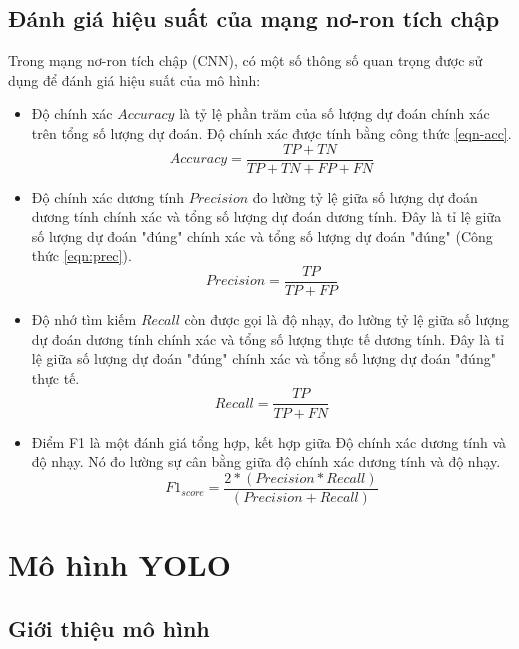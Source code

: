 \subsection{Đánh giá hiệu suất của mạng nơ-ron tích chập}
Trong mạng nơ-ron tích chập (CNN), có một số thông số quan trọng được sử dụng để đánh giá hiệu suất của mô hình:
\begin{itemize}
	\item  Độ chính xác $Accuracy$ là tỷ lệ phần trăm của số lượng dự đoán chính xác trên tổng số lượng dự đoán. Độ chính xác được tính bằng công thức \ref{eqn-acc}.
	\begin{equation}
		\label{eqn:acc}
		Accuracy = \frac{TP + TN}{TP + TN + FP + FN}
	\end{equation}
	
	\item Độ chính xác dương tính $Precision$ đo lường tỷ lệ giữa số lượng dự đoán dương tính chính xác và tổng số lượng dự đoán dương tính. Đây là tỉ lệ giữa số lượng dự đoán "đúng" chính xác và tổng số lượng dự đoán "đúng" (Công thức \ref{eqn:prec}).
	\begin{equation}
		\label{eqn:prec}
		Precision = \frac{TP}{TP + FP}
	\end{equation}	
	\item Độ nhớ tìm kiếm $Recall$ còn được gọi là độ nhạy, đo lường tỷ lệ giữa số lượng dự đoán dương tính chính xác và tổng số lượng thực tế dương tính. Đây là tỉ lệ giữa số lượng dự đoán "đúng" chính xác và tổng số lượng dự đoán "đúng" thực tế.
	\begin{equation}
		\label{eqn:recall}
		Recall = \frac{TP}{TP + FN}
	\end{equation}	
	
	\item Điểm F1 là một đánh giá tổng hợp, kết hợp giữa Độ chính xác dương tính và độ nhạy. Nó đo lường sự cân bằng giữa độ chính xác dương tính và độ nhạy. 
	\begin{equation}
		\label{eqn:f1}
		F1_{score} = \frac{2 * (Precision * Recall)}{(Precision + Recall)}
	\end{equation}
	
\end{itemize}


\section{Mô hình YOLO}

\subsection{Giới thiệu mô hình}


